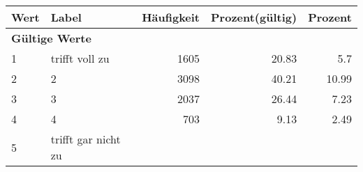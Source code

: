      \begin{longtable}{lXrrr}
     \toprule
     \textbf{Wert} & \textbf{Label} & \textbf{Häufigkeit} & \textbf{Prozent(gültig)} & \textbf{Prozent} \\
     \endhead
     \midrule
     \multicolumn{5}{l}{\textbf{Gültige Werte}}\\

     1 &
     \multicolumn{1}{X}{ trifft voll zu   } &


       \num{1605} &
       \num[round-mode=places,round-precision=2]{20.83} &
         \num[round-mode=places,round-precision=2]{5.7} \\

     2 &
     \multicolumn{1}{X}{ 2   } &


       \num{3098} &
       \num[round-mode=places,round-precision=2]{40.21} &
         \num[round-mode=places,round-precision=2]{10.99} \\

     3 &
     \multicolumn{1}{X}{ 3   } &


       \num{2037} &
       \num[round-mode=places,round-precision=2]{26.44} &
         \num[round-mode=places,round-precision=2]{7.23} \\

     4 &
     \multicolumn{1}{X}{ 4   } &


       \num{703} &
       \num[round-mode=places,round-precision=2]{9.13} &
         \num[round-mode=places,round-precision=2]{2.49} \\

     5 &
     \multicolumn{1}{X}{ trifft gar nicht zu   } &



\end{longtable}
